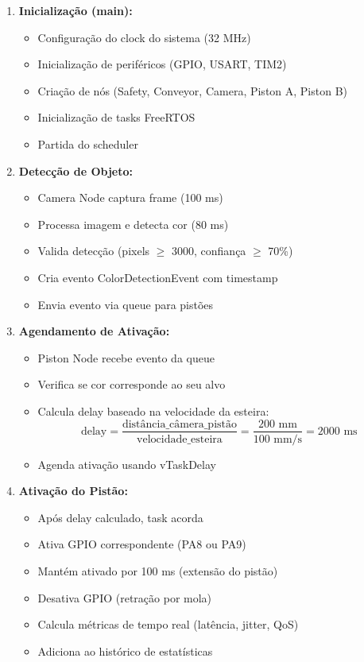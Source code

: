 \documentclass[12pt,a4paper]{article}
\begin{document}
\begin{enumerate}
    \item \textbf{Inicialização (main):}
    \begin{itemize}
        \item Configuração do clock do sistema (32 MHz)
        \item Inicialização de periféricos (GPIO, USART, TIM2)
        \item Criação de nós (Safety, Conveyor, Camera, Piston A, Piston B)
        \item Inicialização de tasks FreeRTOS
        \item Partida do scheduler
    \end{itemize}

    \item \textbf{Detecção de Objeto:}
    \begin{itemize}
        \item Camera Node captura frame (100 ms)
        \item Processa imagem e detecta cor (80 ms)
        \item Valida detecção (pixels $\geq$ 3000, confiança $\geq$ 70\%)
        \item Cria evento ColorDetectionEvent com timestamp
        \item Envia evento via queue para pistões
    \end{itemize}

    \item \textbf{Agendamento de Ativação:}
    \begin{itemize}
        \item Piston Node recebe evento da queue
        \item Verifica se cor corresponde ao seu alvo
        \item Calcula delay baseado na velocidade da esteira:
        \[
        \text{delay} = \frac{\text{distância\_câmera\_pistão}}{\text{velocidade\_esteira}} = \frac{200 \text{ mm}}{100 \text{ mm/s}} = 2000 \text{ ms}
        \]
        \item Agenda ativação usando vTaskDelay
    \end{itemize}

    \item \textbf{Ativação do Pistão:}
    \begin{itemize}
        \item Após delay calculado, task acorda
        \item Ativa GPIO correspondente (PA8 ou PA9)
        \item Mantém ativado por 100 ms (extensão do pistão)
        \item Desativa GPIO (retração por mola)
        \item Calcula métricas de tempo real (latência, jitter, QoS)
        \item Adiciona ao histórico de estatísticas
    \end{itemize}


\end{enumerate}
\end{document}
